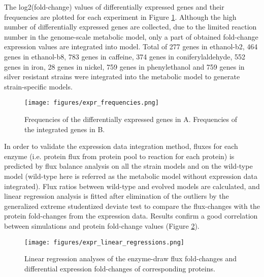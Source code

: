 The log2(fold-change) values of differentially expressed genes and their frequencies are plotted for each experiment in Figure \ref{fig:expr_frequencies}. Although the high number of differentially expressed genes are collected, due to the limited reaction number in the genome-scale metabolic model, only a part of obtained fold-change expression values are integrated into model. Total of 277 genes in ethanol-b2, 464 genes in ethanol-b8, 783 genes in caffeine, 374 genes in coniferylaldehyde, 552 genes in iron, 28 genes in nickel, 759 genes in phenylethanol and 759 genes in silver resistant strains were integrated into the metabolic model to generate strain-specific models.

\begin{figure}[H]
\begin{center}
\texttt{[image: figures/expr\_frequencies.png]}
\caption[Frequencies of the differentially expressed genes]{Frequencies of the differentially expressed genes in A. Frequencies of the integrated genes in B.}
\end{center}
\label{fig:expr_frequencies}
\end{figure}

In order to validate the expression data integration method, fluxes for each enzyme (i.e. protein flux from protein pool to reaction for each protein) is predicted by flux balance analysis on all the strain models and on the wild-type model (wild-type here is referred as the metabolic model without expression data integrated). Flux ratios between wild-type and evolved models are calculated, and linear regression analysis is fitted after elimination of the outliers by the generalized extreme studentized deviate test to compare the flux-changes with the protein fold-changes from the expression data. Results confirm a good correlation between simulations and protein fold-change values (Figure \ref{fig:expr_linear_regressions}).

\begin{figure}[H]
\begin{center}
\texttt{[image: figures/expr\_linear\_regressions.png]}
\caption[Linear regression analyses of the fold-changes]{Linear regression analyses of the enzyme-draw flux fold-changes and differential expression fold-changes of corresponding proteins.}
\end{center}
\label{fig:expr_linear_regressions}
\end{figure}




